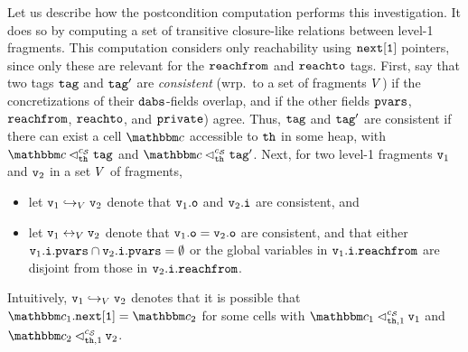 Let us describe how the postcondition computation performs this investigation.
It does so by computing a set of transitive closure-like relations
between level-1 fragments. This computation considers only reachability
using $\tt next[1]$ pointers, since only these are relevant for the
$\mathtt{reachfrom}$ and $\mathtt{reachto}$ tags.
First, say that two tags
$\mathtt{tag}$ and $\mathtt{tag}'$ are {\em consistent}
(wrp.\ to a set of fragments $V$) if the concretizations of their
$\mathtt{dabs}$-fields overlap, and if the other fields
$\mathtt{pvars}$, $\mathtt{reachfrom}$, $\mathtt{reachto}$, and $\mathtt{private}$) agree.
Thus, $\mathtt{tag}$ and $\mathtt{tag}'$ are consistent if there can exist a cell
$\cell$ accessible to ${\tt th}$ in some heap,
with $\cell \satfrag{\thread}{\sconf} \atag$
and $\cell \satfrag{\thread}{\sconf} \atag'$.
Next, for two level-1 fragments $\mathtt{v}_1$ and $\mathtt{v}_2$ in a
set $V$ of fragments,
\begin{itemize}
\item let $\mathtt{v}_1 \hookrightarrow_{V} \mathtt{v}_2$ denote that $\mathtt{v}_1.\mathtt{o}$   and $\mathtt{v}_2.\mathtt{i}$ are consistent, and
\item let $\mathtt{v}_1 \leftrightarrow_{V} \mathtt{v}_2$ denote that $\mathtt{v}_1.\mathtt{o} = \mathtt{v}_2.\mathtt{o}$ are consistent, and that either
  $\mathtt{v}_1.\mathtt{i}.\mathtt{pvars} \cap \mathtt{v}_2.\mathtt{i}.\mathtt{pvars} = \emptyset$ or
  the global variables in  $\mathtt{v}_1.\mathtt{i}.\mathtt{reachfrom}$ are disjoint from
  those in $\mathtt{v}_2.\mathtt{i}.\mathtt{reachfrom}$.

\end{itemize}
Intuitively, $\mathtt{v}_1 \hookrightarrow_{V} \mathtt{v}_2$ denotes that it is
possible that  $\cell_1.{\tt next[1]} = \cell_2$ for some cells with
  $\cell_1 \lsatfrag{1}{{\thread}}{\sconf} \frag_1$ and
  $\cell_2 \lsatfrag{1}{{\thread}}{\sconf} \frag_2$.
